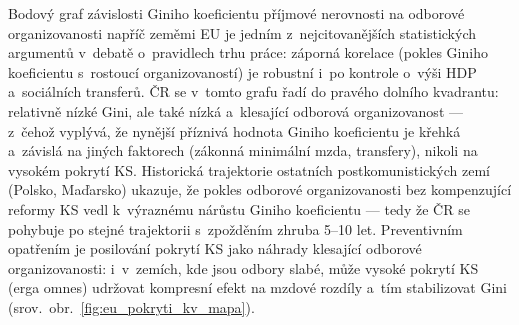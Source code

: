 Bodový graf závislosti Giniho koeficientu příjmové nerovnosti na odborové organizovanosti napříč zeměmi \ac{EU} je jedním z~nejcitovanějších statistických argumentů v~debatě o~pravidlech trhu práce: záporná korelace (pokles Giniho koeficientu s~rostoucí organizovaností) je robustní i~po kontrole o~výši \ac{HDP} a~sociálních transferů.
ČR se v~tomto grafu řadí do pravého dolního kvadrantu: relativně nízké Gini, ale také nízká a~klesající odborová organizovanost --- z~čehož vyplývá, že nynější příznivá hodnota Giniho koeficientu je křehká a~závislá na jiných faktorech (zákonná minimální mzda, transfery), nikoli na vysokém pokrytí \acs{KS}.
Historická trajektorie ostatních postkomunistických zemí (Polsko, Maďarsko) ukazuje, že pokles odborové organizovanosti bez kompenzující reformy \ac{KS} vedl k~výraznému nárůstu Giniho koeficientu --- tedy že \ac{ČR} se pohybuje po stejné trajektorii s~zpožděním zhruba 5--10 let.
Preventivním opatřením je posilování pokrytí \ac{KS} jako náhrady klesající odborové organizovanosti: i~v~zemích, kde jsou odbory slabé, může vysoké pokrytí \ac{KS} (erga omnes) udržovat kompresní efekt na mzdové rozdíly a~tím stabilizovat Gini (srov.~obr.~\ref{fig:eu_pokryti_kv_mapa}).


